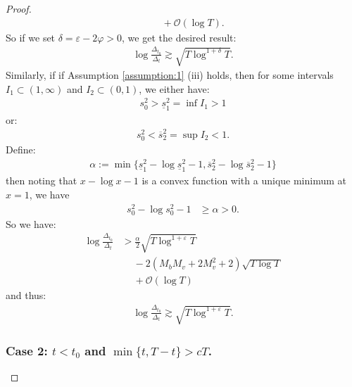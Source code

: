 \begin{proof}
\begin{align*}
    &\quad\: + \mathcal{O}(\log T).
\end{align*}
So if we set $\delta = \varepsilon - 2\varphi > 0$, we get the desired result:
\begin{align*}
    \log \frac{\Delta_{t_0}}{\Delta_t} \gtrsim \sqrt{T\log^{1+\delta} T}.
\end{align*}
Similarly, if if Assumption \ref{assumption:1} (iii) holds, then for some intervals $I_1 \subset (1,\infty)$ and $I_2 \subset (0,1)$, we either have:
\begin{align*}
   s_0^2 > \underline{s}^2_1 = \inf I_1  > 1
\end{align*}
or:
\begin{align*}
   s_0^2 < \overline{s}^2_2 = \sup I_2 < 1.
\end{align*}
Define:
\begin{align*}
    \alpha := \min\{\underline{s}_1^2 - \log \underline{s}_1^2 - 1, \overline{s}_2^2 - \log \overline{s}_2^2 - 1\}
\end{align*}
then noting that $x - \log x - 1$ is a convex function with a unique minimum at $x = 1$, we have
\begin{align*}
    s_0^2 - \log s_0^2 - 1 &\geq \alpha > 0.
\end{align*}
So we have:
\begin{align*}
    \log \frac{\Delta_{t_0}}{\Delta_t} &>  \frac{\alpha}{2}\sqrt{T\log^{1+\varepsilon} T} \\
    &\quad\: - 2 \left(M_bM_v +2M_v^2 + 2 \right) \sqrt{T \log T} \\
    &\quad\: + \mathcal{O}(\log T)
\end{align*}
and thus: 
\begin{align*}
    \log \frac{\Delta_{t_0}}{\Delta_t} \gtrsim \sqrt{T\log^{1+\varepsilon} T}.
\end{align*}

\subsubsection*{Case 2: $t < t_0$ and $\min\{t, T-t\} > cT$.}


\end{proof}
